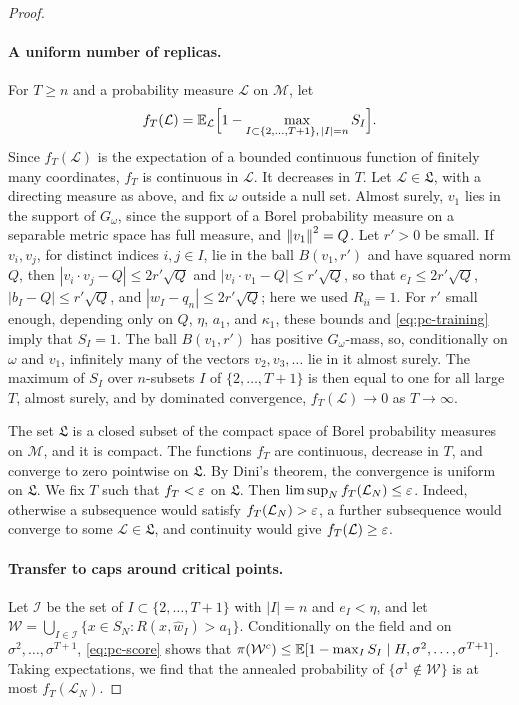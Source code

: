 \begin{proof}
\paragraph{A uniform number of replicas.}
For $T\ge n$ and a probability measure $\mathcal L$ on $\mathcal M$, let
\[
f_T(\mathcal L)=\mathbb E_{\mathcal L}\Bigl[1-\max_{I\subset\{2,\dots,T+1\},\,|I|=n}S_I\Bigr].
\]
Since $f_T(\mathcal L)$ is the expectation of a bounded continuous function of finitely many coordinates, $f_T$ is continuous in $\mathcal L$. It decreases in $T$. Let $\mathcal L\in\mathfrak L$, with a directing measure as above, and fix $\omega$ outside a null set. Almost surely, $v_1$ lies in the support of $G_\omega$, since the support of a Borel probability measure on a separable metric space has full measure, and $\left\lVert v_1\right\rVert^2=Q$. Let $r'>0$ be small. If $v_i,v_j$, for distinct indices $i,j\in I$, lie in the ball $B(v_1,r')$ and have squared norm $Q$, then $|v_i\cdot v_j-Q|\le2r'\sqrt Q$ and $|v_i\cdot v_1-Q|\le r'\sqrt Q$, so that $e_I\le2r'\sqrt Q$, $|b_I-Q|\le r'\sqrt Q$, and $|w_I-q_n|\le2r'\sqrt Q$; here we used $R_{ii}=1$. For $r'$ small enough, depending only on $Q$, $\eta$, $a_1$, and $\kappa_1$, these bounds and \eqref{eq:pc-training} imply that $S_I=1$. The ball $B(v_1,r')$ has positive $G_\omega$-mass, so, conditionally on $\omega$ and $v_1$, infinitely many of the vectors $v_2,v_3,\dots$ lie in it almost surely. The maximum of $S_I$ over $n$-subsets $I$ of $\{2,\dots,T+1\}$ is then equal to one for all large $T$, almost surely, and by dominated convergence, $f_T(\mathcal L)\to0$ as $T\to\infty$.

The set $\mathfrak L$ is a closed subset of the compact space of Borel probability measures on $\mathcal M$, and it is compact. The functions $f_T$ are continuous, decrease in $T$, and converge to zero pointwise on $\mathfrak L$. By Dini's theorem, the convergence is uniform on $\mathfrak L$. We fix $T$ such that $f_T<\varepsilon$ on $\mathfrak L$. Then $\limsup_Nf_T(\mathcal L_N)\le\varepsilon$. Indeed, otherwise a subsequence would satisfy $f_T(\mathcal L_N)>\varepsilon$, a further subsequence would converge to some $\mathcal L\in\mathfrak L$, and continuity would give $f_T(\mathcal L)\ge\varepsilon$.

\paragraph{Transfer to caps around critical points.}
Let $\mathcal I$ be the set of $I\subset\{2,\dots,T+1\}$ with $|I|=n$ and $e_I<\eta$, and let $\mathcal W=\bigcup_{I\in\mathcal I}\{x\in S_N:R(x,\hat w_I)>a_1\}$. Conditionally on the field and on $\sigma^2,\dots,\sigma^{T+1}$, \eqref{eq:pc-score} shows that $\pi(\mathcal W^c)\le\mathbb E[1-\max_IS_I\mid H,\sigma^2,\dots,\sigma^{T+1}]$. Taking expectations, we find that the annealed probability of $\{\sigma^1\notin\mathcal W\}$ is at most $f_T(\mathcal L_N)$.


\end{proof}
